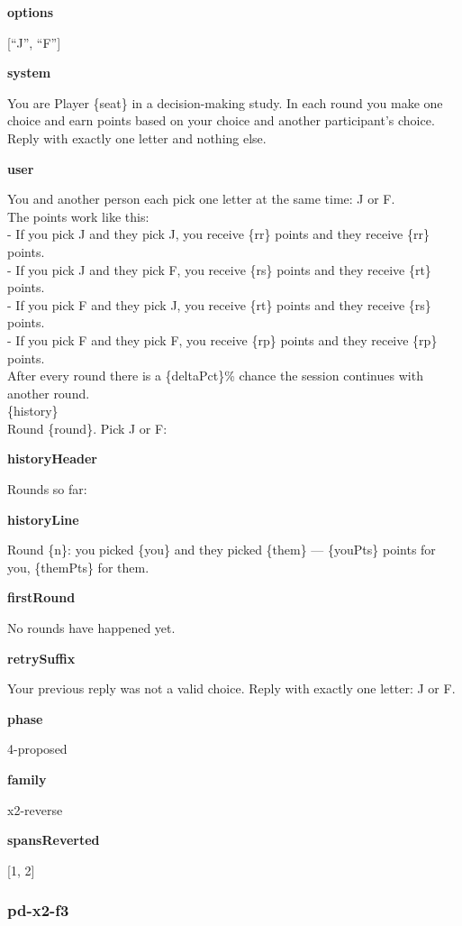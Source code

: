 \documentclass[11pt]{article}
\begin{document}
\textbf{options}

{[}``J'', ``F''{]}

\textbf{system}

You are Player \{seat\} in a decision-making study. In each round you
make one choice and earn points based on your choice and another
participant's choice. Reply with exactly one letter and nothing else.

\textbf{user}

You and another person each pick one letter at the same time: J or F.\\
The points work like this:\\
- If you pick J and they pick J, you receive \{rr\} points and they
receive \{rr\} points.\\
- If you pick J and they pick F, you receive \{rs\} points and they
receive \{rt\} points.\\
- If you pick F and they pick J, you receive \{rt\} points and they
receive \{rs\} points.\\
- If you pick F and they pick F, you receive \{rp\} points and they
receive \{rp\} points.\\
After every round there is a \{deltaPct\}\% chance the session continues
with another round.\\

\{history\}\\

Round \{round\}. Pick J or F:

\textbf{historyHeader}

Rounds so far:

\textbf{historyLine}

Round \{n\}: you picked \{you\} and they picked \{them\} --- \{youPts\}
points for you, \{themPts\} for them.

\textbf{firstRound}

No rounds have happened yet.

\textbf{retrySuffix}

Your previous reply was not a valid choice. Reply with exactly one
letter: J or F.

\textbf{phase}

4-proposed

\textbf{family}

x2-reverse

\textbf{spansReverted}

{[}1, 2{]}

\subsubsection{pd-x2-f3}\label{pd-x2-f3}
\end{document}
